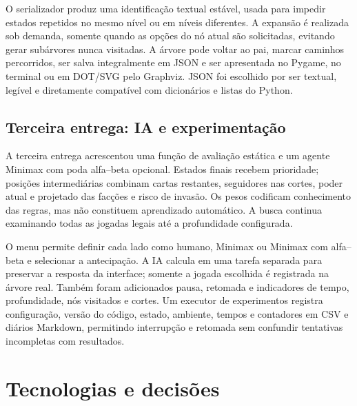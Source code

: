 \documentclass[12pt]{article}
\begin{document}
O serializador produz uma identificação textual estável, usada para impedir estados repetidos no mesmo nível ou em níveis diferentes. A expansão é realizada sob demanda, somente quando as opções do nó atual são solicitadas, evitando gerar subárvores nunca visitadas. A árvore pode voltar ao pai, marcar caminhos percorridos, ser salva integralmente em JSON e ser apresentada no Pygame, no terminal ou em DOT/SVG pelo Graphviz. JSON foi escolhido por ser textual, legível e diretamente compatível com dicionários e listas do Python.

\subsection{Terceira entrega: IA e experimentação}

A terceira entrega acrescentou uma função de avaliação estática e um agente Minimax com poda alfa--beta opcional. Estados finais recebem prioridade; posições intermediárias combinam cartas restantes, seguidores nas cortes, poder atual e projetado das facções e risco de invasão. Os pesos codificam conhecimento das regras, mas não constituem aprendizado automático. A busca continua examinando todas as jogadas legais até a profundidade configurada.

O menu permite definir cada lado como humano, Minimax ou Minimax com alfa--beta e selecionar a antecipação. A IA calcula em uma tarefa separada para preservar a resposta da interface; somente a jogada escolhida é registrada na árvore real. Também foram adicionados pausa, retomada e indicadores de tempo, profundidade, nós visitados e cortes. Um executor de experimentos registra configuração, versão do código, estado, ambiente, tempos e contadores em CSV e diários Markdown, permitindo interrupção e retomada sem confundir tentativas incompletas com resultados.

\section{Tecnologias e decisões}
\end{document}
